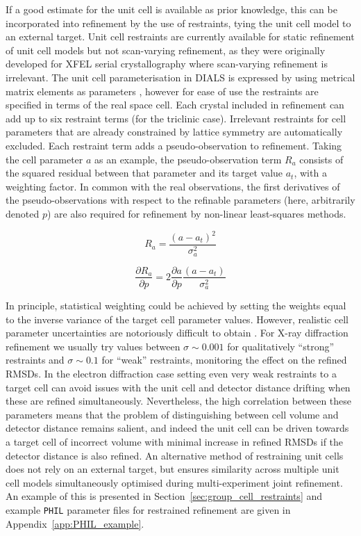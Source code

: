 \documentclass[preprint]{iucr}
\newcommand{\code}{\texttt}
\newcommand{\pder}[2][]{\frac{\partial#1}{\partial#2}}
\begin{document}
If a good estimate for the unit cell is available as prior knowledge, this can
be incorporated into refinement by the use of restraints, tying the
unit cell model to an external target. Unit cell restraints are currently
available for static refinement of unit cell models but not scan-varying
refinement, as they were originally developed for XFEL serial crystallography
where scan-varying refinement is irrelevant. The unit cell parameterisation in
DIALS is expressed by using metrical matrix elements as parameters
\cite{Waterman2016}, however for ease of use the restraints are specified in terms of
the real space cell. Each crystal included in refinement can add up to six
restraint terms (for the triclinic case). Irrelevant restraints for cell
parameters that are already constrained by lattice symmetry are automatically excluded. Each
restraint term adds a pseudo-observation to refinement. Taking the cell
parameter $a$ as an example, the pseudo-observation term $R_a$ consists of the squared
residual between that parameter and its target value $a_t$, with a weighting
factor. In common with the real observations, the first derivatives of the
pseudo-observations with respect to the refinable parameters (here, arbitrarily
denoted $p$) are also required for refinement by non-linear least-squares methods.

\begin{equation}
\label{eq:restraint_to_target}
R_a = \frac{\left( a - a_t \right)^2}{\sigma_a^2}
\end{equation}

\begin{equation}
\pder[R_a]{p} = 2 \pder[a]{p} \frac{\left( a - a_t \right)}{\sigma_a^2}
\end{equation}


In principle, statistical weighting could be achieved by
setting the weights equal to the inverse variance of the target cell parameter
values. However, realistic cell parameter uncertainties are notoriously
difficult to obtain \cite{Dauter2015}. For X-ray diffraction refinement we
usually try values between $\sigma \sim 0.001$ for qualitatively ``strong''
restraints and $\sigma \sim 0.1$ for ``weak'' restraints, monitoring the
effect on the refined RMSDs. In the electron diffraction case setting even very
weak restraints to a target cell can avoid issues with the unit cell and
detector distance drifting when these are refined simultaneously. Nevertheless,
the high correlation between these parameters means that the problem of
distinguishing between cell volume and detector distance remains salient, and
indeed the unit cell can be driven towards a target cell of incorrect volume
with minimal increase in refined RMSDs if the detector distance is also
refined. An alternative method of restraining unit cells does not rely on an
external target, but ensures similarity across multiple unit cell models
simultaneously optimised during multi-experiment joint refinement. An example
of this is presented in Section~\ref{sec:group_cell_restraints} and example
\code{PHIL} parameter files for restrained refinement are given in
Appendix~\ref{app:PHIL_example}.
\end{document}
